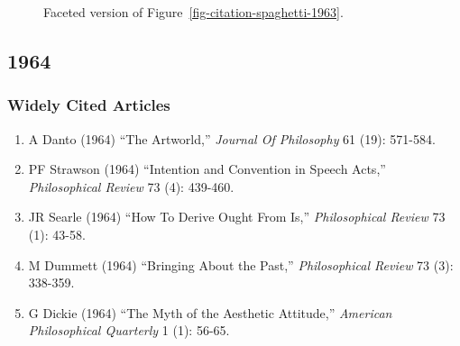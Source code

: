 \documentclass[
  10pt,
  letterpaper,
  DIV=11,
  numbers=noendperiod,
  twoside]{scrartcl}
\providecommand{\tightlist}{%
  \setlength{\itemsep}{0pt}\setlength{\parskip}{0pt}}\usepackage{longtable,booktabs,array}
\begin{document}
\begin{figure}


\caption{\label{fig-citation-facet-1963}Faceted version of
Figure~\ref{fig-citation-spaghetti-1963}.}

\end{figure}%

\newpage

\subsection{1964}\label{sec-s1964}

\subsubsection*{Widely Cited Articles}\label{widely-cited-articles-8}

\begin{enumerate}
\def\labelenumi{\arabic{enumi}.}
\tightlist
\item
  A Danto (1964) ``The Artworld,'' \emph{Journal Of Philosophy} 61 (19):
  571-584.
\item
  PF Strawson (1964) ``Intention and Convention in Speech Acts,''
  \emph{Philosophical Review} 73 (4): 439-460.
\item
  JR Searle (1964) ``How To Derive Ought From Is,'' \emph{Philosophical
  Review} 73 (1): 43-58.
\item
  M Dummett (1964) ``Bringing About the Past,'' \emph{Philosophical
  Review} 73 (3): 338-359.
\item
  G Dickie (1964) ``The Myth of the Aesthetic Attitude,'' \emph{American
  Philosophical Quarterly} 1 (1): 56-65.
\end{enumerate}
\end{document}
